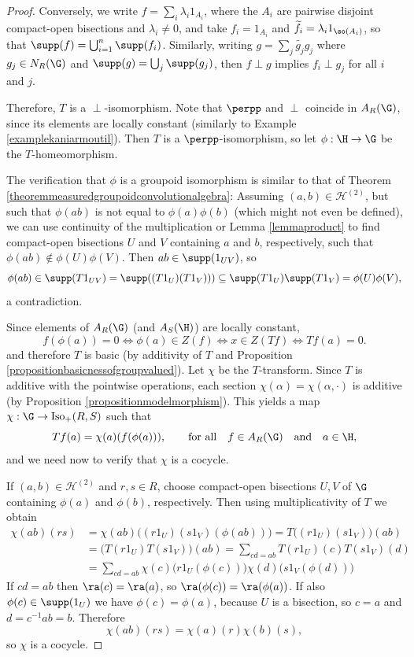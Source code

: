 \begin{proof}
Conversely, we write $f=\sum_i\lambda_i1_{A_i}$, where the $A_i$ are pairwise disjoint compact-open bisections and $\lambda_i\neq 0$, and take $f_i=1_{A_i}$ and $\widetilde{f_i}=\lambda_i1_{\so(A_i)}$, so that $\supp(f)=\bigcup_{i=1}^n\supp(f_i)$. Similarly, writing $g=\sum_j\widetilde{g_j}g_j$ where $g_j\in N_R(\G)$ and $\supp(g)=\bigcup_j\supp(g_j)$, then $f\perp g$ implies $f_i\perp g_j$ for all $i$ and $j$.

Therefore, $T$ is a $\perp$-isomorphism. Note that $\perpp$ and $\perp$ coincide in $A_R(\G)$, since its elements are locally constant (similarly to Example \ref{examplekaniarmoutil}). Then $T$ is a $\perpp$-isomorphism, so let $\phi:\H\to\G$ be the $T$-homeomorphism.

The verification that $\phi$ is a groupoid isomorphism is similar to that of Theorem \ref{theoremmeasuredgroupoidconvolutionalgebra}: Assuming $(a,b)\in\mathcal{H}^{(2)}$, but such that $\phi(ab)$ is not equal to $\phi(a)\phi(b)$ (which might not even be defined), we can use continuity of the multiplication or Lemma \ref{lemmaproduct} to find compact-open bisections $U$ and $V$ containing $a$ and $b$, respectively, such that $\phi(ab)\not\in\phi(U)\phi(V)$. Then $ab\in\supp(1_{UV})$, so
\[\phi(ab)\in\supp(T1_{UV})=\supp((T1_U)(T1_V)))\subseteq\supp(T1_U)\supp(T1_V)=\phi(U)\phi(V),\]
a contradiction.

Since elements of $A_R(\G)$ (and $A_S(\H)$) are locally constant,
\[f(\phi(a))=0\iff \phi(a)\in Z(f)\iff x\in Z(Tf)\iff Tf(a)=0.\]
and therefore $T$ is basic (by additivity of $T$ and Proposition \ref{propositionbasicnessofgroupvalued}). Let $\chi$ be the $T$-transform. Since $T$ is additive with the pointwise operations, each section $\chi(\alpha)=\chi(\alpha,\cdot)$ is additive (by Proposition \ref{propositionmodelmorphism}). This yields a map $\chi:\G\to\operatorname{Iso}_+(R,S)$ such that
\[Tf(a)=\chi(a)(f(\phi(a))),\qquad\text{for all}\quad f\in A_R(\G)\quad\text{and}\quad a\in\H,\]
and we need now to verify that $\chi$ is a cocycle.

If $(a,b)\in\mathcal{H}^{(2)}$ and $r,s\in R$, choose compact-open bisections $U,V$ of $\G$ containing $\phi(a)$ and $\phi(b)$, respectively. Then using multiplicativity of $T$ we obtain
\begin{align*}
\chi(ab)(rs)&=\chi(ab)\big((r1_U)(s1_V)(\phi(ab))\big)=T\big((r1_U)(s1_V)\big)(ab)\\
&=\big(T(r1_U)T(s1_V)\big)(ab)=\sum_{cd=ab}T(r1_U)(c)T(s1_V)(d)\\
&=\sum_{cd=ab}\chi(c)\big(r1_U(\phi(c))\big)\chi(d)\big(s1_V(\phi(d))\big)
\end{align*}
If $cd=ab$ then $\ra(c)=\ra(a)$, so $\ra(\phi(c))=\ra(\phi(a))$. If also $\phi(c)\in\supp(1_U)$ we have $\phi(c)=\phi(a)$, because $U$ is a bisection, so $c=a$ and $d=c^{-1}ab=b$. Therefore
\[\chi(ab)(rs)=\chi(a)(r)\chi(b)(s),\]
so $\chi$ is a cocycle.


\end{proof}

